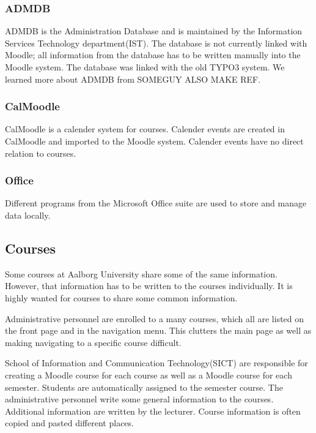 \subsubsection{ADMDB}
ADMDB is the Administration Database and is maintained by the Information Services Technology department(IST).
The database is not currently linked with Moodle; all information from the database has to be written manually into the Moodle system.
The database was linked with the old TYPO3 system.
We learned more about ADMDB from SOMEGUY ALSO MAKE REF. 

\subsubsection{CalMoodle}
CalMoodle is a calender system for courses.
Calender events are created in CalMoodle and imported to the Moodle system.
Calender events have no direct relation to courses.

\subsubsection{Office}
Different programs from the Microsoft Office suite are used to store and manage data locally.




\subsection{Courses}
Some courses at Aalborg University share some of the same information.
However, that information has to be written to the courses individually.
It is highly wanted for courses to share some common information.

Administrative personnel are enrolled to a many courses, which all are listed on the front page and in the navigation menu.
This clutters the main page as well as making navigating to a specific course difficult.

School of Information and Communication Technology(SICT) are responsible for creating a Moodle course for each course as well as a Moodle course for each semester. 
Students are automatically assigned to the semester course.
The administrative personnel write some general information to the courses.
Additional information are written by the lecturer.
Course information is often copied and pasted different places.
